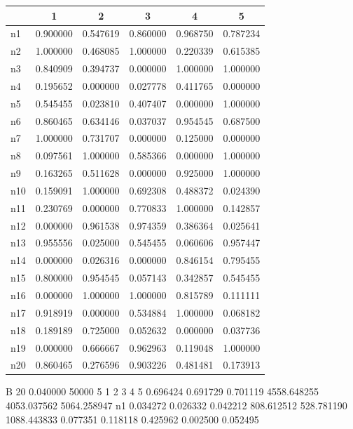 \documentclass[twocolumn]{article}
\begin{document}
\begin{table}
    \centering 
    \label{fig:fullrange_delay}
    \begin{tabular}{l|c|c|c|c|c}
           & 1 & 2 & 3 & 4 & 5 \\
        \hline
        n1 & 0.900000 & 0.547619 & 0.860000 & 0.968750 & 0.787234 \\
        n2 & 1.000000 & 0.468085 & 1.000000 & 0.220339 & 0.615385 \\
        n3 & 0.840909 & 0.394737 & 0.000000 & 1.000000 & 1.000000 \\
        n4 & 0.195652 & 0.000000 & 0.027778 & 0.411765 & 0.000000 \\
        n5 & 0.545455 & 0.023810 & 0.407407 & 0.000000 & 1.000000 \\
        n6 & 0.860465 & 0.634146 & 0.037037 & 0.954545 & 0.687500 \\
        n7 & 1.000000 & 0.731707 & 0.000000 & 0.125000 & 0.000000 \\
        n8 & 0.097561 & 1.000000 & 0.585366 & 0.000000 & 1.000000 \\
        n9 & 0.163265 & 0.511628 & 0.000000 & 0.925000 & 1.000000 \\
       n10 & 0.159091 & 1.000000 & 0.692308 & 0.488372 & 0.024390 \\
       n11 & 0.230769 & 0.000000 & 0.770833 & 1.000000 & 0.142857 \\
       n12 & 0.000000 & 0.961538 & 0.974359 & 0.386364 & 0.025641 \\
       n13 & 0.955556 & 0.025000 & 0.545455 & 0.060606 & 0.957447 \\
       n14 & 0.000000 & 0.026316 & 0.000000 & 0.846154 & 0.795455 \\
       n15 & 0.800000 & 0.954545 & 0.057143 & 0.342857 & 0.545455 \\
       n16 & 0.000000 & 1.000000 & 1.000000 & 0.815789 & 0.111111 \\
       n17 & 0.918919 & 0.000000 & 0.534884 & 1.000000 & 0.068182 \\
       n18 & 0.189189 & 0.725000 & 0.052632 & 0.000000 & 0.037736 \\
       n19 & 0.000000 & 0.666667 & 0.962963 & 0.119048 & 1.000000 \\
       n20 & 0.860465 & 0.276596 & 0.903226 & 0.481481 & 0.173913
    \end{tabular}
B 20 0.040000 50000 5 1 2 3 4 5
0.696424 0.691729 0.701119
4558.648255 4053.037562 5064.258947
n1 0.034272 0.026332 0.042212 808.612512 528.781190 1088.443833 0.077351 0.118118 0.425962 0.002500 0.052495

\end{table}
\end{document}
